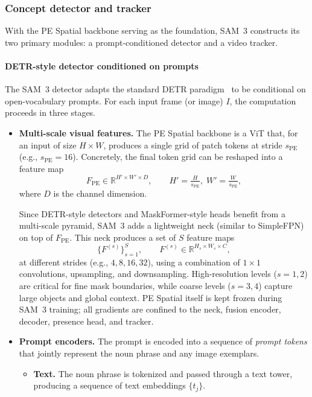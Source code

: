 \begin{enrichment}
\begin{enrichment}
		\subsubsection*{Concept detector and tracker}
		
		With the PE Spatial backbone serving as the foundation, SAM~3 constructs its two primary modules: a prompt-conditioned detector and a video tracker.
		
		\paragraph{DETR-style detector conditioned on prompts}
		
		The SAM~3 detector adapts the standard DETR paradigm~\cite{carion2020_detr} to be conditional on open-vocabulary prompts. For each input frame (or image) $I$, the computation proceeds in three stages.
		
		\begin{itemize}
			\item \textbf{Multi-scale visual features.}
			The PE Spatial backbone is a ViT that, for an input of size $H \times W$, produces a single grid of patch tokens at stride $s_{\text{PE}}$ (e.g., $s_{\text{PE}} = 16$). Concretely, the final token grid can be reshaped into a feature map
			\[
			F_{\text{PE}} \in \mathbb{R}^{H' \times W' \times D}, \qquad H' = \tfrac{H}{s_{\text{PE}}}, \; W' = \tfrac{W}{s_{\text{PE}}},
			\]
			where $D$ is the channel dimension.
			
			Since DETR-style detectors and MaskFormer-style heads benefit from a multi-scale pyramid, SAM~3 adds a lightweight neck (similar to SimpleFPN) on top of $F_{\text{PE}}$. This neck produces a set of $S$ feature maps
			\[
			\{F^{(s)}\}_{s=1}^S, \qquad F^{(s)} \in \mathbb{R}^{H_s \times W_s \times C},
			\]
			at different strides (e.g., $4, 8, 16, 32$), using a combination of $1\times 1$ convolutions, upsampling, and downsampling. High-resolution levels ($s=1,2$) are critical for fine mask boundaries, while coarse levels ($s=3,4$) capture large objects and global context. PE Spatial itself is kept frozen during SAM~3 training; all gradients are confined to the neck, fusion encoder, decoder, presence head, and tracker.
			
			\item \textbf{Prompt encoders.}
			The prompt is encoded into a sequence of \emph{prompt tokens} that jointly represent the noun phrase and any image exemplars.
			\begin{itemize}
				\item \textbf{Text.} The noun phrase is tokenized and passed through a text tower, producing a sequence of text embeddings $\{t_j\}$.
				

\end{itemize}
\end{itemize}
\end{enrichment}
\end{enrichment}
